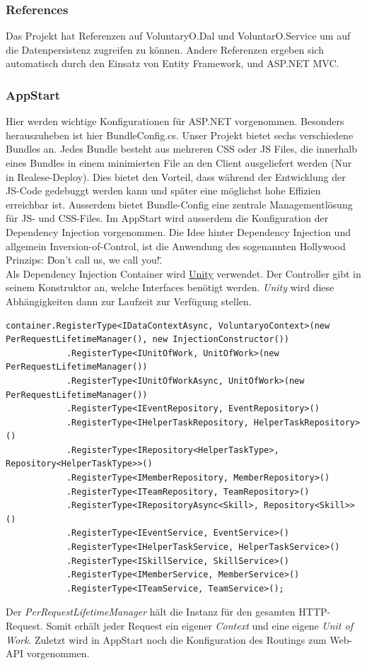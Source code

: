 		\subsubsection{References}
			Das Projekt hat Referenzen auf VoluntaryO.Dal und VoluntarO.Service um auf die Datenpersistenz zugreifen zu können. Andere Referenzen ergeben sich automatisch durch den Einsatz von Entity Framework, und ASP.NET MVC.
		
		\subsubsection{AppStart}
			Hier werden wichtige Konfigurationen für ASP.NET vorgenommen. Besonders herauszuheben ist hier BundleConfig.cs. Unser Projekt bietet sechs verschiedene Bundles an. Jedes Bundle besteht aus mehreren CSS oder JS Files, die innerhalb eines Bundles in einem minimierten File an den Client ausgeliefert werden (Nur in Realese-Deploy). Dies bietet den Vorteil, dass während der Entwicklung der JS-Code gedebuggt werden kann und später eine möglichst hohe Effizien erreichbar ist. Ausserdem bietet Bundle-Config eine zentrale Managementlösung für JS- und CSS-Files.
			Im AppStart wird ausserdem die Konfiguration der Dependency Injection vorgenommen.
			Die Idee hinter Dependency Injection und allgemein Inversion-of-Control, ist die Anwendung des sogenannten Hollywood Prinzips: \"Don’t call us, we call you!\". 
			\\Als Dependency Injection Container wird \href{http://unity.codeplex.com/}{Unity} verwendet. Der Controller gibt in seinem Konstruktor an, welche Interfaces benötigt werden. \textit{Unity} wird diese Abhängigkeiten dann zur Laufzeit zur Verfügung stellen.
			\begin{lstlisting}[language=CSharp, caption=UnityConfig.cs, label=lst:unityconfig, firstnumber=1]
			container.RegisterType<IDataContextAsync, VoluntaryoContext>(new PerRequestLifetimeManager(), new InjectionConstructor())
		    .RegisterType<IUnitOfWork, UnitOfWork>(new PerRequestLifetimeManager())
		    .RegisterType<IUnitOfWorkAsync, UnitOfWork>(new PerRequestLifetimeManager())
		    .RegisterType<IEventRepository, EventRepository>()
		    .RegisterType<IHelperTaskRepository, HelperTaskRepository>()
		    .RegisterType<IRepository<HelperTaskType>, Repository<HelperTaskType>>()
		    .RegisterType<IMemberRepository, MemberRepository>()
		    .RegisterType<ITeamRepository, TeamRepository>()
		    .RegisterType<IRepositoryAsync<Skill>, Repository<Skill>>()
		    .RegisterType<IEventService, EventService>()
		    .RegisterType<IHelperTaskService, HelperTaskService>()
		    .RegisterType<ISkillService, SkillService>()
		    .RegisterType<IMemberService, MemberService>()
		    .RegisterType<ITeamService, TeamService>();
		    \end{lstlisting}
		    Der \textit{PerRequestLifetimeManager} hält die Instanz für den gesamten HTTP-Request. Somit erhält jeder Request ein eigener \textit{Context} und eine eigene \textit{Unit of Work}.
		    Zuletzt wird in AppStart noch die Konfiguration des Routings zum Web-API vorgenommen.

